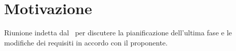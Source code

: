 \documentclass[../RiunioneInterna16-05-25.tex]{subfiles}
\begin{document}
\section{Motivazione}
Riunione indetta dal \responsabilediprogetto\ per discutere la pianificazione dell'ultima fase e le modifiche dei requisiti in accordo con il proponente.
\end{document}
